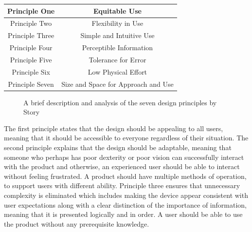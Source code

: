 \begin{center}
    \begin{tabular}{ |c|c| } %
     \hline
     Principle One & Equitable Use \cite{sevenprinciples} \\
     \hline
     Principle Two & Flexibility in Use \cite{sevenprinciples} \\ 
     \hline
     Principle Three & Simple and Intuitive Use \cite{sevenprinciples} \\ 
     \hline
     Principle Four & Perceptible Information \cite{sevenprinciples} \\
     \hline 
     Principle Five & Tolerance for Error \cite{sevenprinciples} \\ 
     \hline
     Principle Six & Low Physical Effort \cite{sevenprinciples} \\ 
     \hline
     Principle Seven & Size and Space for Approach and Use \cite{sevenprinciples} \\
     \hline
    \end{tabular}
\end{center}

\begin{figure}
    \caption{A brief description and analysis of the seven design principles by Story \cite{sevenprinciples}} %
    \label{fig:DesignPrinciples}
\end{figure}

The first principle states that the design should be appealing to all users, meaning that it should be accessible to everyone regardless of their situation.
The second principle explains that the design should be adaptable, meaning that someone who perhaps has poor dexterity or poor vision can successfully interact with the product and otherwise, an experienced user should be able to interact without feeling frustrated. %
A product should have multiple methods of operation, to support users with different ability.
Principle three ensures that unnecessary complexity is eliminated which includes making the device appear consistent with user expectations along with a clear distinction of the importance of information, meaning that it is presented logically and in order.
A user should be able to use the product without any prerequisite knowledge.

